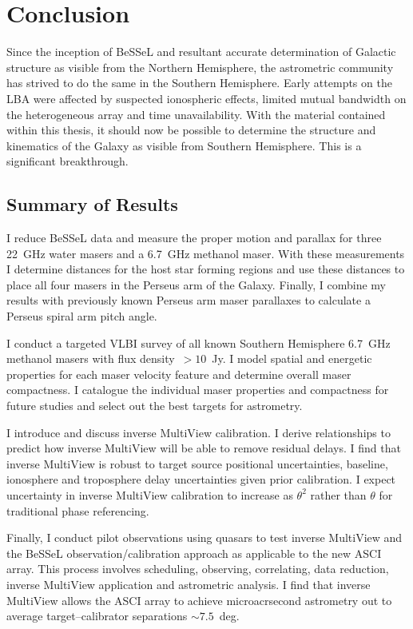 \chapter{Conclusion}
	Since the inception of BeSSeL and resultant accurate determination of Galactic structure as visible from the Northern Hemisphere, the astrometric community has strived to do the same in the Southern Hemisphere. Early attempts on the LBA were affected by suspected ionospheric effects, limited mutual bandwidth on the heterogeneous array and time unavailability. With the material contained within this thesis, it should now be possible to determine the structure and kinematics of the Galaxy as visible from Southern Hemisphere. This is a significant breakthrough.

\section{Summary of Results}	
	I reduce BeSSeL data and measure the proper motion and parallax for three 22~GHz water masers and a 6.7~GHz methanol maser. With these measurements I determine distances for the host star forming regions and use these distances to place all four masers in the Perseus arm of the Galaxy. Finally, I combine my results with previously known Perseus arm maser parallaxes to calculate a Perseus spiral arm pitch angle.
	
	I conduct a targeted VLBI survey of all known Southern Hemisphere 6.7~GHz methanol masers with flux density~$>10$~Jy. I model spatial and energetic properties for each maser velocity feature and determine overall maser compactness. I catalogue the individual maser properties and compactness for future studies and select out the best targets for astrometry.
	
	I introduce and discuss inverse MultiView calibration. I derive relationships to predict how inverse MultiView will be able to remove residual delays. I find that inverse MultiView is robust to target source positional uncertainties, baseline, ionosphere and troposphere delay uncertainties given prior calibration. I expect uncertainty in inverse MultiView calibration to increase as $\theta^2$ rather than $\theta$ for traditional phase referencing.
	
	Finally, I conduct pilot \spirals\space observations using quasars to test inverse MultiView and the BeSSeL observation/calibration approach as applicable to the new ASCI array. This process involves scheduling, observing, correlating, data reduction, inverse MultiView application and astrometric analysis. I find that inverse MultiView allows the ASCI array to achieve microacrsecond astrometry out to average target--calibrator separations $\sim7.5$~deg.
	
